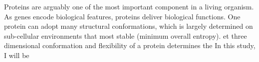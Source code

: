Proteins are arguably one of the most important component in a living organism. As genes encode biological features, proteins deliver biological functions. One protein can adopt many structural conformations, which is largely determined on sub-cellular environments that most stable (minimum overall entropy). et three dimensional conformation and flexibility of a protein determines the     In this study, I will be 